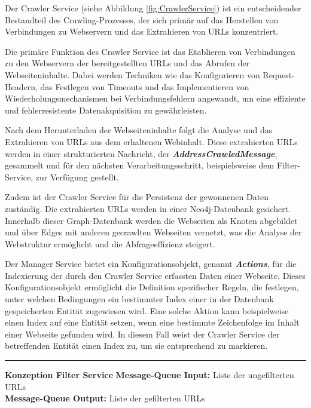 Der Crawler Service (siehe Abbildung \ref{fig:CrawlerService}) ist ein entscheidender Bestandteil des \newline Crawling-Prozesses, der sich primär auf das Herstellen von Verbindungen zu Webservern und das Extrahieren von URLs konzentriert. 

Die primäre Funktion des Crawler Service ist das Etablieren von Verbindungen zu den Webservern der bereitgestellten URLs und das Abrufen der Webseiteninhalte. Dabei werden Techniken wie das Konfigurieren von Request-Headern, das Festlegen von Timeouts und das Implementieren von Wiederholungsmechanismen bei Verbindungsfehlern angewandt, um eine effiziente und fehlerresistente Datenakquisition zu gewährleisten.

Nach dem Herunterladen der Webseiteninhalte folgt die Analyse und das Extrahieren von URLs aus dem erhaltenen Webinhalt. Diese extrahierten URLs werden in einer strukturierten Nachricht, der \textbf{\textit{AddressCrawledMessage}}, gesammelt und für den nächsten Verarbeitungsschritt, beispielsweise dem Filter-Service, zur Verfügung gestellt.

Zudem ist der Crawler Service für die Persistenz der gewonnenen Daten zuständig. Die extrahierten URLs werden in einer Neo4j-Datenbank gesichert. Innerhalb dieser Graph-Datenbank werden die Webseiten als Knoten abgebildet und über Edges mit anderen gecrawlten Webseiten vernetzt, was die Analyse der Webstruktur ermöglicht und die Abfrageeffizienz steigert.

Der Manager Service bietet ein Konfigurationsobjekt, genannt \textit{\textbf{Actions}}, für die Indexierung der durch den Crawler Service erfassten Daten einer Webseite. Dieses Konfigurationsobjekt ermöglicht die Definition spezifischer Regeln, die festlegen, unter welchen Bedingungen ein bestimmter Index einer in der Datenbank gespeicherten Entität zugewiesen wird. Eine solche Aktion kann beispielweise einen Index auf eine Entität setzen, wenn eine bestimmte Zeichenfolge im Inhalt einer Webseite gefunden wird. In diesem Fall weist der Crawler Service der betreffenden Entität einen Index zu, um sie entsprechend zu markieren.

\noindent\rule{\textwidth}{1pt}
\newpage
\textbf{Konzeption Filter Service} \newline
\textbf{Message-Queue Input:} Liste der ungefilterten URLs\\
\textbf{Message-Queue Output:} Liste der gefilterten URLs

